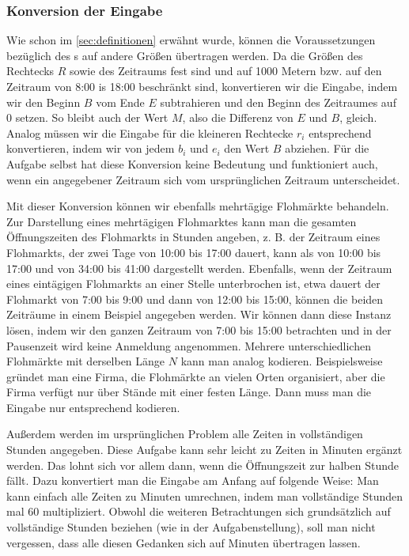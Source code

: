 \subsubsection{Konversion der Eingabe}
Wie schon im \cref{sec:definitionen} erwähnt wurde, können die Voraussetzungen bezüglich des
\fp s auf andere Größen übertragen werden. Da die Größen des Rechtecks $R$ sowie des Zeitraums fest sind
und auf 1000 Metern bzw. auf den Zeitraum von 8:00 is 18:00 beschränkt sind, konvertieren wir
die Eingabe, indem wir den 
Beginn $B$ vom Ende $E$ subtrahieren und den Beginn des Zeitraumes auf 0 setzen.
So bleibt auch der Wert $M$, also die Differenz von $E$ und $B$, gleich. 
Analog müssen wir die Eingabe für die kleineren Rechtecke $r_i$ entsprechend konvertieren, indem wir
von jedem $b_i$ und $e_i$ den Wert $B$ abziehen. Für die Aufgabe selbst hat diese Konversion keine
Bedeutung und funktioniert auch, wenn ein angegebener Zeitraum sich vom ursprünglichen Zeitraum unterscheidet.

Mit dieser Konversion können wir ebenfalls mehrtägige Flohmärkte behandeln.
Zur Darstellung eines mehrtägigen Flohmarktes kann man die gesamten Öffnungszeiten des Flohmarkts in Stunden angeben,
z. B. der Zeitraum eines Flohmarkts, der zwei Tage von 10:00 bis 17:00 dauert,
kann als von 10:00 bis 17:00 und von 34:00 bis 41:00 dargestellt werden. 
Ebenfalls, wenn der Zeitraum eines eintägigen Flohmarkts an einer Stelle unterbrochen ist,
etwa dauert der Flohmarkt von 7:00 bis 9:00 und dann von 12:00 bis 15:00, können die 
beiden Zeiträume in einem Beispiel angegeben werden. Wir können dann diese Instanz lösen,
indem wir den ganzen Zeitraum von 7:00 bis 15:00 betrachten und in der Pausenzeit
wird keine Anmeldung angenommen.
Mehrere unterschiedlichen Flohmärkte mit derselben Länge $N$ kann man analog kodieren.
Beispielsweise gründet man eine Firma, die Flohmärkte an vielen Orten organisiert, aber
die Firma verfügt nur über Stände mit einer festen Länge. Dann muss man die Eingabe nur
entsprechend kodieren.


Außerdem werden im ursprünglichen Problem alle Zeiten in vollständigen Stunden angegeben.
Diese Aufgabe kann sehr leicht zu Zeiten in Minuten ergänzt werden.
Das lohnt sich vor allem dann, wenn die Öffnungszeit zur halben Stunde fällt.
Dazu konvertiert man die Eingabe
am Anfang auf folgende Weise: Man kann einfach alle Zeiten zu Minuten umrechnen, indem
man vollständige Stunden mal 60 multipliziert.
Obwohl die weiteren Betrachtungen sich grundsätzlich auf vollständige Stunden beziehen
(wie in der Aufgabenstellung),
soll man nicht vergessen, dass alle diesen Gedanken sich auf Minuten übertragen lassen.